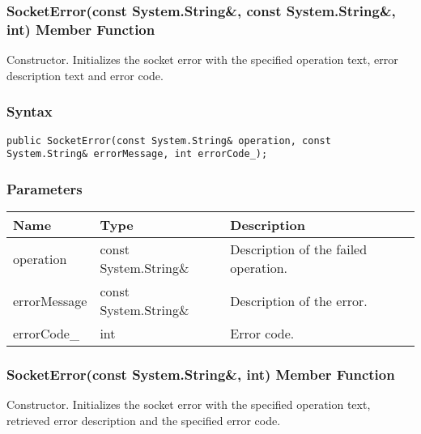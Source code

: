 \documentclass[a4paper,oneside,11.000000pt]{book}
\begin{document}
\hypertarget{System.Net.Sockets.SocketError.constructor.P.System.Net.Sockets.SocketError.C.R.System.String.C.R.System.String.int}{\subsubsection*{SocketError(const System.String\&, const System.String\&, int) Member Function}}
\begin{flushleft}
Constructor. Initializes the socket error with the specified operation text, error description text and error code.

\end{flushleft}
\subsubsection*{Syntax}
\texttt{public SocketError(const System.String\& operation, const System.String\& errorMessage, int errorCode\_);}
\subsubsection*{Parameters}
\begin{flushleft}
\begin{supertabular}[l]{!{\raggedright}p{3.02071cm}!{\raggedright}p{4.63128cm}!{\raggedright}p{5.23538cm}}
\textbf{Name}
& \textbf{Type}
& \textbf{Description}
\\
\hline
operation
& const System.\-String\&\-
& Description of the failed operation.

\\
errorMessage
& const System.\-String\&\-
& Description of the error.

\\
errorCode\_
& int
& Error code.

\\
\end{supertabular}

\end{flushleft}
\clearpage

\hypertarget{System.Net.Sockets.SocketError.constructor.P.System.Net.Sockets.SocketError.C.R.System.String.int}{\subsubsection*{SocketError(const System.String\&, int) Member Function}}
\begin{flushleft}
Constructor. Initializes the socket error with the specified operation text, retrieved error description and the specified error code.

\end{flushleft}
\end{document}
